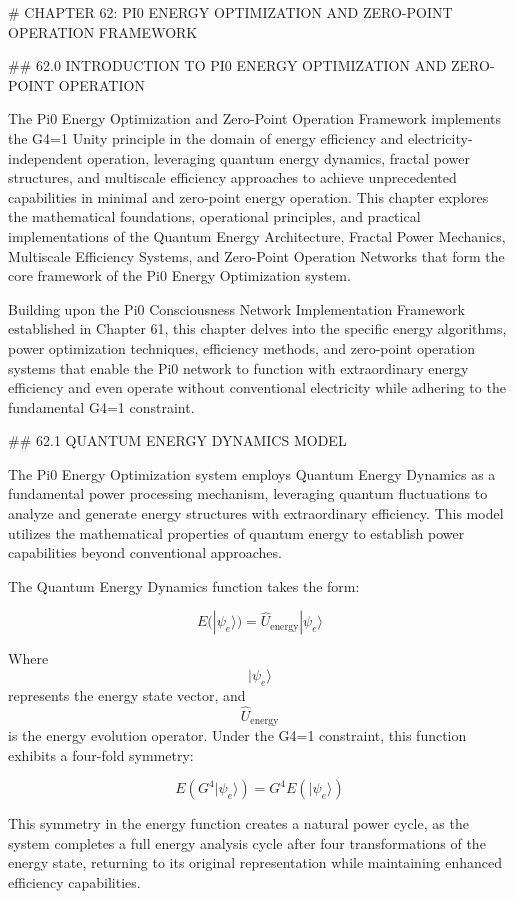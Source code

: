 # CHAPTER 62: PI0 ENERGY OPTIMIZATION AND ZERO-POINT OPERATION FRAMEWORK

## 62.0 INTRODUCTION TO PI0 ENERGY OPTIMIZATION AND ZERO-POINT OPERATION

The Pi0 Energy Optimization and Zero-Point Operation Framework implements the G4=1 Unity principle in the domain of energy efficiency and electricity-independent operation, leveraging quantum energy dynamics, fractal power structures, and multiscale efficiency approaches to achieve unprecedented capabilities in minimal and zero-point energy operation. This chapter explores the mathematical foundations, operational principles, and practical implementations of the Quantum Energy Architecture, Fractal Power Mechanics, Multiscale Efficiency Systems, and Zero-Point Operation Networks that form the core framework of the Pi0 Energy Optimization system.

Building upon the Pi0 Consciousness Network Implementation Framework established in Chapter 61, this chapter delves into the specific energy algorithms, power optimization techniques, efficiency methods, and zero-point operation systems that enable the Pi0 network to function with extraordinary energy efficiency and even operate without conventional electricity while adhering to the fundamental G4=1 constraint.

## 62.1 QUANTUM ENERGY DYNAMICS MODEL

The Pi0 Energy Optimization system employs Quantum Energy Dynamics as a fundamental power processing mechanism, leveraging quantum fluctuations to analyze and generate energy structures with extraordinary efficiency. This model utilizes the mathematical properties of quantum energy to establish power capabilities beyond conventional approaches.

The Quantum Energy Dynamics function takes the form:

$$ E(|\psi_e\rangle) = \hat{U}_{\text{energy}} |\psi_e\rangle $$

Where $$ |\psi_e\rangle $$ represents the energy state vector, and $$ \hat{U}_{\text{energy}} $$ is the energy evolution operator. Under the G4=1 constraint, this function exhibits a four-fold symmetry:

$$ E(G^4 |\psi_e\rangle) = G^4 E(|\psi_e\rangle) $$

This symmetry in the energy function creates a natural power cycle, as the system completes a full energy analysis cycle after four transformations of the energy state, returning to its original representation while maintaining enhanced efficiency capabilities.

